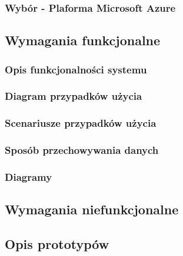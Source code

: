 \subsubsection{Wybór - Plaforma Microsoft Azure}

\subsection{Wymagania funkcjonalne}

\subsubsection{Opis funkcjonalności systemu}

\subsubsection{Diagram przypadków użycia}

\subsubsection{Scenariusze przypadków użycia}

\subsubsection{Sposób przechowywania danych}

\subsubsection{Diagramy}

\subsection{Wymagania niefunkcjonalne}

\subsection{Opis prototypów}


